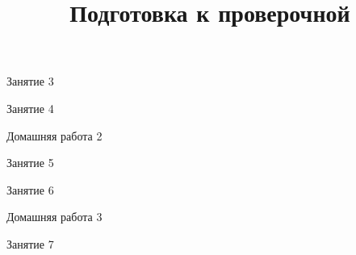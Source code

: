 \begin{class}[number=3]
	\begin{listofex}
		\item Занятие 3 
	\end{listofex}
\end{class}

\begin{class}[number=4]
	\begin{listofex}
		\item Занятие 4
	\end{listofex}
\end{class}

\begin{homework}[number=2]
	\begin{listofex}
		\item Домашняя работа 2
	\end{listofex}
\end{homework}

\begin{class}[number=5]
	\begin{listofex}
		\item Занятие 5
	\end{listofex}
\end{class}

\begin{class}[number=6]
	\begin{listofex}
		\item Занятие 6
	\end{listofex}
\end{class}

\begin{homework}[number=3]
	\begin{listofex}
		\item Домашняя работа 3
	\end{listofex}
\end{homework}

\begin{class}[number=7]
	\title{Подготовка к проверочной}
	\begin{listofex}
		\item Занятие 7
	\end{listofex}
\end{class}


